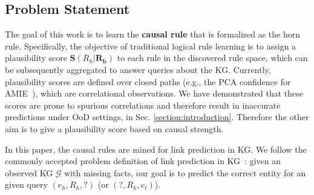 

\subsection{Problem Statement}
The goal of this work is to learn the \textbf{causal rule} that is formalized as the horn rule.
Specifically, the objective of traditional logical rule learning is to assign a plausibility score $\mathbf{S}(R_h|\mathbf{R_b})$ to each rule in the discovered rule space, which can be subsequently aggregated to answer queries about the KG.
Currently, plausibility scores are defined over closed paths (e.g., the PCA confidence for AMIE~\cite{galarraga_amie_2013}), which are correlational observations.
We have demonstrated that these scores are prone to spurious correlations and therefore result in inaccurate predictions under OoD settings, in Sec. \ref{section:introduction}.
Therefore the other aim is to give a plausibility score based on causal strength.


In this paper, the causal rules are mined for link prediction in KG.
We follow the commonly accepted problem definition of link prediction in KG~\cite{rossi2021knowledge,tiwari2021revisiting}:
given an observed KG $\mathcal{G}$ with missing facts, our goal is to predict the correct entity for an given query $(e_h,R_h,?)$ (or $(?,R_h,e_t)$).
